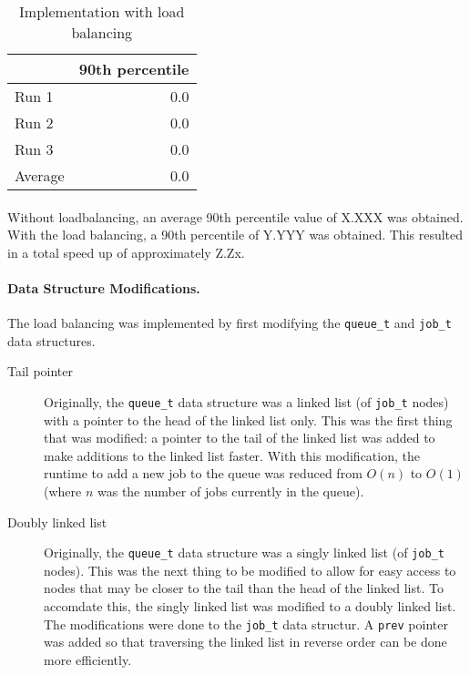 \documentclass[12pt]{article}
\begin{document}
\begin{table}[H]
  \centering
  \begin{tabular}{lr}
    & {\bf 90th percentile} \\
    \hline
    Run 1 & 0.0 \\
    Run 2 & 0.0 \\
    Run 3 & 0.0 \\
    \hline
    Average & 0.0 \\
  \end{tabular}
  \caption{Implementation with load balancing}
  \label{tbl-part2-loadbalance}
\end{table}

\paragraph{} Without loadbalancing, an average 90th percentile value of X.XXX was obtained. With the load balancing, a 90th percentile of Y.YYY was obtained. This resulted in a total speed up of approximately Z.Zx.

\paragraph{Data Structure Modifications.} The load balancing was implemented by first modifying the {\tt queue\_t} and {\tt job\_t} data structures.
\begin{description}
  \item [Tail pointer] Originally, the {\tt queue\_t} data structure was a linked list (of {\tt job\_t} nodes) with a pointer to the head of the linked list only. This was the first thing that was modified: a pointer to the tail of the linked list was added to make additions to the linked list faster. With this modification, the runtime to add a new job to the queue was reduced from \( O(n) \) to \( O(1) \) (where \( n \) was the number of jobs currently in the queue).

  \item [Doubly linked list] Originally, the {\tt queue\_t} data structure was a singly linked list (of {\tt job\_t} nodes). This was the next thing to be modified to allow for easy access to nodes that may be closer to the tail than the head of the linked list. To accomdate this, the singly linked list was modified to a doubly linked list. The modifications were done to the {\tt job\_t} data structur. A {\tt prev} pointer was added so that traversing the linked list in reverse order can be done more efficiently.
\end{description}
\end{document}
